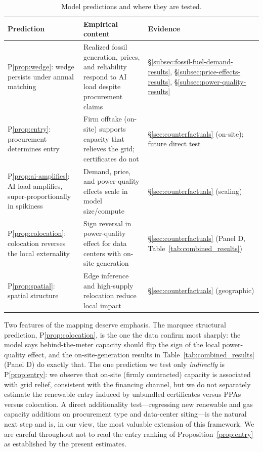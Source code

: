 \documentclass[a4paper,fleqn,longmktitle]{cas-sc}
\theoremstyle{plain}
\theoremstyle{definition}
\begin{document}
\begin{table}[t]
\centering
\caption{Model predictions and where they are tested.}
\label{tab:predictions}
\footnotesize
\begin{tabularx}{\linewidth}{@{}l>{\RaggedRight\arraybackslash}X l@{}}
\toprule
\textbf{Prediction} & \textbf{Empirical content} & \textbf{Evidence} \\
\midrule
P\ref{prop:wedge}: wedge persists under annual matching & Realized fossil generation, prices, and reliability respond to AI load despite procurement claims & \S\ref{subsec:fossil-fuel-demand-results}, \S\ref{subsec:price-effects-results}, \S\ref{subsec:power-quality-results} \\
P\ref{prop:entry}: procurement determines entry & Firm offtake (on-site) supports capacity that relieves the grid; certificates do not & \S\ref{sec:counterfactuals} (on-site); future direct test \\
P\ref{prop:ai-amplifies}: AI load amplifies, super-proportionally in spikiness & Demand, price, and power-quality effects scale in model size/compute & \S\ref{sec:counterfactuals} (scaling) \\
P\ref{prop:colocation}: colocation reverses the local externality & Sign reversal in power-quality effect for data centers with on-site generation & \S\ref{sec:counterfactuals} (Panel D, Table~\ref{tab:combined_results}) \\
P\ref{prop:spatial}: spatial structure & Edge inference and high-supply relocation reduce local impact & \S\ref{sec:counterfactuals} (geographic) \\
\bottomrule
\end{tabularx}
\end{table}

Two features of the mapping deserve emphasis. The marquee structural prediction, P\ref{prop:colocation}, is the one the data confirm most sharply: the model says behind-the-meter capacity should flip the sign of the local power-quality effect, and the on-site-generation results in Table~\ref{tab:combined_results} (Panel D) do exactly that. The one prediction we test only \emph{indirectly} is P\ref{prop:entry}: we observe that on-site (firmly contracted) capacity is associated with grid relief, consistent with the financing channel, but we do not separately estimate the renewable entry induced by unbundled certificates versus PPAs versus colocation. A direct additionality test---regressing new renewable and gas capacity additions on procurement type and data-center siting---is the natural next step and is, in our view, the most valuable extension of this framework. We are careful throughout not to read the entry ranking of Proposition~\ref{prop:entry} as established by the present estimates.
\end{document}
